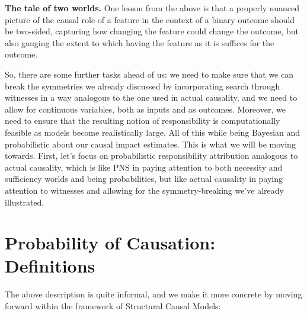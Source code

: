 \documentclass[twoside,11pt]{article}
\begin{document}
\vspace{2mm}
\noindent \textbf{The tale of two worlds.} One lesson from the above is that a properly nuanced picture of the causal role of a feature in the context of a binary outcome should be two-sided, capturing how changing the feature could change the outcome, but also gauging the extent to which having the feature as it is suffices for the outcome.


So, there are some further tasks ahead of us: we need to make sure that we can break the symmetries we already discussed by incorporating search through witnesses in a way analogous to the one used in actual causality, and we need to allow for continuous variables, both as inputs and as outcomes. Moreover, we need to ensure that the resulting notion of responsibility is computationally feasible as models become realistically large. All of this while being Bayesian and probabilistic about our causal impact estimates. This is what we will be moving towards. First, let's focus on probabilistic responsibility attribution analogous to actual causality, which is like PNS in paying attention to both necessity and sufficiency worlds and being probabilities, but like actual causality in paying attention to witnesses and allowing for the symmetry-breaking we've already illustrated.







\section{Probability of Causation: Definitions} \label{sec:definitions}



The above description is quite informal, and we make it more concrete by moving forward within the framework of  Structural Causal Models:
\end{document}
